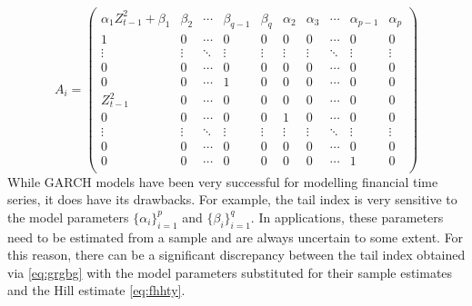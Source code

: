 \[
A_i =
\begin{pmatrix}
  \alpha_1 Z_{t-1}^2 + \beta_1 & \beta_2 & \cdots &
  \beta_{q-1} & \beta_q & \alpha_2 & \alpha_3 &
  \cdots & \alpha_{p-1} & \alpha_p\\
  1 & 0 & \cdots & 
  0 & 0 & 0 & 0 & \cdots & 0 & 0 \\
  \vdots & \vdots & \ddots & 
  \vdots & \vdots & \vdots & \vdots &
  \ddots & \vdots & \vdots \\
  0 & 0 & \cdots &
  0 & 0 & 0 & 0 & \cdots & 0 & 0 \\
  0 & 0 & \cdots &
  1 & 0 & 0 & 0 & \cdots & 0 & 0 \\
  Z_{t-1}^2 & 0 & \cdots &
  0 & 0 & 0 & 0 & \cdots & 0 & 0 \\
  0 & 0 & \cdots &
  0 & 0 & 1 & 0 & \cdots & 0 & 0 \\
  \vdots & \vdots & \ddots &
  \vdots & \vdots & \vdots & \vdots &
  \ddots & \vdots & \vdots \\
  0 & 0 & \cdots &
  0 & 0 & 0 & 0 & \cdots & 0 & 0 \\    
  0 & 0 & \cdots &
  0 & 0 & 0 & 0 & \cdots & 1 & 0 \\    
\end{pmatrix}
\]
While GARCH models have been very successful for modelling financial
time series, it does have its drawbacks. For example, the tail
index is very sensitive to the model parameters $\{\alpha_i\}_{i=1}^p$ and
$\{\beta_i\}_{i=1}^q$. In applications, these parameters need to be
estimated from a sample and are always uncertain to some extent. For
this reason, there can be a significant discrepancy between the tail
index obtained via \eqref{eq:grgbg} with the model parameters
substituted for their sample estimates and the Hill estimate
\eqref{eq:fhhty}.


